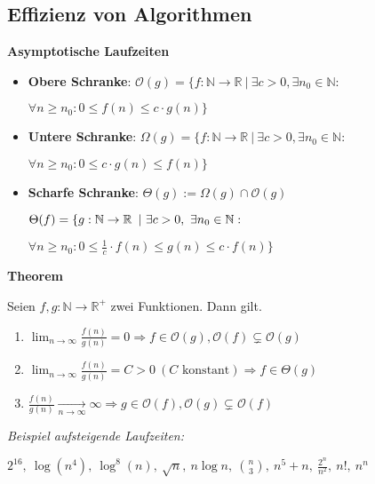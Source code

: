 \documentclass[german]{latex4ei/latex4ei_sheet}
\begin{document}
\begin{sectionbox}
\subsection{Effizienz von Algorithmen}\smallskip

\textbf{Asymptotische Laufzeiten}\par
\begin{itemize}
    \item \textbf{Obere Schranke}: $\mathcal{O}(g)=\{f:\mathbb{N} \rightarrow \mathbb{R}\ |\ \exists c>0, \exists n_{0} \in \mathbb{N}:$\par $\forall n \geq n_{0}: 0 \leq f(n) \leq c \cdot g(n)\}$
    \item \textbf{Untere Schranke}: $\Omega(g)=\{f: \mathbb{N} \rightarrow \mathbb{R}\ |\ \exists c>0, \exists n_{0} \in \mathbb{N}:$ \par $\forall n \geq n_{0}: 0 \leq c \cdot g(n) \leq f(n)\}$
    \item \textbf{Scharfe Schranke}: $\Theta(g):=\Omega(g) \cap \mathcal{O}(g)$\par
    $\Theta(f) = \{  g: \N \rightarrow \R\ |\ \exists c>0,\ \exists n_0 \in \N:$\par $\forall n \geq n_0: 0 \leq \frac1c \cdot f(n)\leq g(n) \leq c \cdot f(n)\}$
\end{itemize}\par\smallskip

\begin{greenbox}
\textbf{Theorem}\par
Seien $f, g: \mathbb{N} \rightarrow \mathbb{R}^{+}$ zwei Funktionen. Dann gilt.
\begin{enumerate}
    \item $\lim _{n \rightarrow \infty} \frac{f(n)}{g(n)}=0 \Rightarrow f \in \mathcal{O}(g), \mathcal{O}(f) \subsetneq \mathcal{O}(g)$
    \item $\lim _{n \rightarrow \infty} \frac{f(n)}{g(n)}=C>0\ (C \text { konstant}) \Rightarrow f \in \Theta(g)$
    \item $\frac{f(n)}{g(n)} \underset{n \rightarrow \infty}{\longrightarrow} \infty \Rightarrow g \in \mathcal{O}(f), \mathcal{O}(g) \subsetneq \mathcal{O}(f)$
\end{enumerate}
\end{greenbox}\smallskip
\textit{Beispiel aufsteigende Laufzeiten:}\par
$ 2^{16},\ \log(n^4),\ \log^8(n),\ \sqrt{n},\ n\log n,\ \binom{n}{3},\ n^5+n,\ \frac{2^n}{n^2},\ n!,\ n^n$\par\smallskip


\end{sectionbox}
\end{document}
